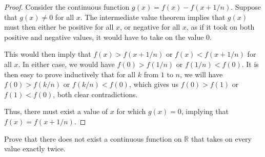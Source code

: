 \documentclass[10pt, oneside]{amsart}
\newenvironment{problem}[2][Problem]{\begin{trivlist}
\item[\hskip \labelsep {\bfseries #1}\hskip \labelsep {\bfseries #2.}]}{\end{trivlist}}
\begin{document}
    \begin{proof}
      Consider the continuous function $g(x) = f(x) - f(x + 1/n)$. Suppose that $g(x) \neq 0$ for all $x$. The intermediate value theorem implies that $g(x)$ must then either be
      positive for all $x$, or negative for all $x$, as if it took on both positive and negative values, it would have to take on the value $0$.
      \newline

      This would then imply that $f(x) > f(x + 1/n)$ or $f(x) < f(x + 1/n)$ for all $x$. In either case, we would have $f(0) > f(1/n)$ or $f(1/n) < f(0)$. It is then
      easy to prove inductively that for all $k$ from $1$ to $n$, we will have $f(0) > f(k/n)$ or $f(k/n) < f(0)$, which gives us $f(0) > f(1)$ or $f(1) < f(0)$, both
      clear contradictions.
      \newline

      Thus, there must exist a value of $x$ for which $g(x) = 0$, implying that $f(x) = f(x + 1/n)$.
    \end{proof}

    \begin{problem}{10.19b}
      
    \end{problem}

    \begin{problem}{10.20a}
      Prove that there does not exist a continuous function on $\mathbb{R}$ that takes on every value exactly twice.
    \end{problem}
\end{document}
